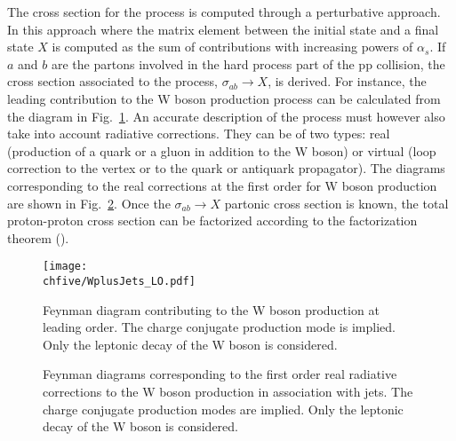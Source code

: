 The cross section for the process is computed through a perturbative  approach.
In this approach where the matrix element between the initial state and a final state $X$ is computed as the sum of contributions with increasing powers of $\alpha_s$.
If $a$ and $b$ are the partons involved in the hard process part of the pp collision, the cross section associated to the process, $\sigma_{ab} \rightarrow X$, is derived.
For instance, the leading contribution to the W boson production process can be calculated from the diagram in Fig.~\ref{fig:wjets_LO}.
An accurate description of the process must however also take into account radiative corrections. They can be of two types: real (production of a quark or a gluon in addition to the W boson) or virtual (loop correction to the vertex or to the quark or antiquark propagator). The diagrams corresponding to the real corrections at the first order for W boson production are shown in Fig.~\ref{fig:wjets_NLO}.
Once the $\sigma_{ab} \rightarrow X$ partonic cross section is known, the total proton-proton cross section can be factorized according to the factorization theorem ().

\begin{figure}[!htb]
\centering
\texttt{[image: \\chfive/WplusJets\_LO.pdf]}
\caption{Feynman diagram contributing to the W boson production at leading order. The charge conjugate production mode is implied. Only the leptonic decay of the W boson is considered.}
\label{fig:wjets_LO}
\end{figure}

\begin{figure}[!htb]
\centering
{}
\caption{Feynman diagrams corresponding to the first order real radiative corrections to the W boson production in association with jets. The charge conjugate production modes are implied. Only the leptonic decay of the W boson is considered.}
\label{fig:wjets_NLO}
\end{figure}

